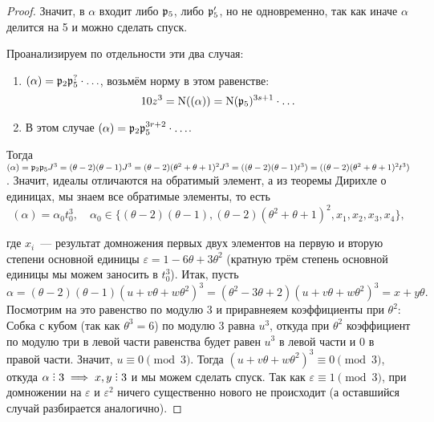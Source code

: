 \begin{proof}
	  	Значит, в $\alpha$ входит либо $\mathfrak{p}_{5}$, либо $\mathfrak{p}'_{5}$, но не одновременно, так как иначе $\alpha$ делится на 5 и можно сделать спуск. 

	  	Проанализируем по отдельности эти два случая: 
	  	\begin{enumerate}
	  		\item $(\alpha) = \mathfrak{p}_{2} \mathfrak{p}_{5}^{?} \cdot \ldots$, возьмём норму в этом равенстве: 
	  		\[
	  			10z^3 = \operatorname{\mathrm{N}}((\alpha)) = \operatorname{\mathrm{N}}(\mathfrak{p}_5)^{3s + 1} \cdot \ldots
	  		\]
	  		\item В этом случае $(\alpha) = \mathfrak{p}_2 \mathfrak{p}_5^{3r + 2} \cdot \ldots$. 
	  	\end{enumerate}

	  	Тогда $(\alpha) = \mathfrak{p}_2 \mathfrak{p}_5 J^3 = (\theta - 2)(\theta - 1)J^3 = (\theta - 2)(\theta^2 + \theta + 1)^2 J^3 = ((\theta - 2)(\theta - 1)t^3) = ((\theta - 2)(\theta^2 + \theta + 1)^2 t^3)$. Значит, идеалы отличаются на обратимый элемент, а из теоремы Дирихле о единицах, мы знаем все обратимые элементы, то есть 
  		\[
  			(\alpha) = \alpha_0 t_0^3, \quad \alpha_0 \in \{ (\theta - 2)(\theta - 1), (\theta - 2)(\theta^2 + \theta + 1)^2,  x_1, x_2, x_3, x_4 \},
  		\]

  		где $x_i$~--- результат домножения первых двух элементов на первую и вторую степени основной единицы $\varepsilon = 1 - 6\theta + 3\theta^2$ (кратную трём степень основной единицы мы можем заносить в $t_0^3$). Итак, пусть 
  		\[
  			\alpha = (\theta - 2)(\theta - 1)(u + v\theta + w\theta^2)^3 = (\theta^2 - 3\theta + 2)(u + v\theta + w\theta^2)^3 = x + y \theta.
  		\]
  		Посмотрим на это равенство по модулю 3 и приравнеяем коэффициенты при $\theta^2$: 
  		Собка с кубом (так как $\theta^3 = 6$) по модулю 3 равна $u^3$, откуда при $\theta^2$ коэффициент по модулю три в левой части равенства будет равен $u^3$ в левой части и 0 в правой части. Значит, $u \equiv 0 \pmod{3}$. Тогда $(u + v\theta + w\theta^2)^3 \equiv 0 \pmod{3}$, откуда $\alpha \divby 3 \implies x, y \divby 3$ и мы можем сделать спуск. Так как $\varepsilon \equiv 1 \pmod{3}$, при домножении на $\varepsilon$ и $\varepsilon^2$ ничего существенно нового не происходит (а оставшийся случай разбирается аналогично). 

	  	


 	  \end{proof}

	  


 



